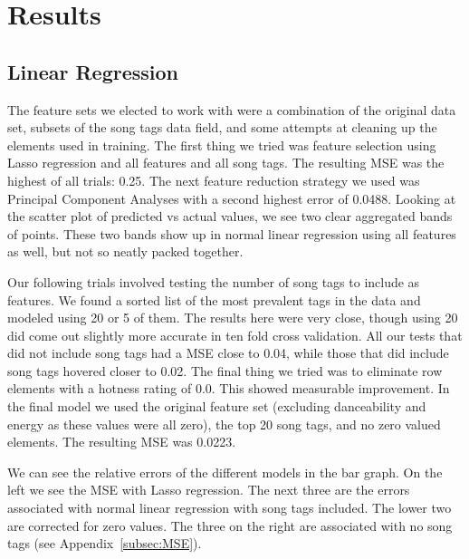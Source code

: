 \documentclass[12pt]{article}
\begin{document}
\section{Results}
\label{sec:results}
\subsection{Linear Regression}
\label{subsec:linearRegressionResults}
The feature sets we elected to work with were a combination of the original data set, subsets of the song tags data field, and some attempts at cleaning up the elements used in training. The first thing we tried was feature selection using Lasso regression and all features and all song tags. The resulting MSE was the highest of all trials: 0.25. The next feature reduction strategy we used was Principal Component Analyses with a second highest error of 0.0488. Looking at the scatter plot of predicted vs actual values, we see two clear aggregated bands of points. These two bands show up in normal linear regression using all features as well, but not so neatly packed together.

Our following trials involved testing the number of song tags to include as features. We found a sorted list of the most prevalent tags in the data and modeled using 20 or 5 of them. The results here were very close, though using 20 did come out slightly more accurate in ten fold cross validation. All our tests that did not include song tags had a MSE close to 0.04, while those that did include song tags hovered closer to 0.02. The final thing we tried was to eliminate row elements with a hotness rating of 0.0. This showed measurable improvement. In the final model we used the original feature set (excluding danceability and energy as these values were all zero), the top 20 song tags, and no zero valued elements. The resulting MSE was 0.0223.

We can see the relative errors of the different models in the bar graph. On the left we see the MSE with Lasso regression. The next three are the errors associated with normal linear regression with song tags included. The lower two are corrected for zero values. The three on the right are associated with no song tags (see Appendix~\ref{subsec:MSE}).
\end{document}
